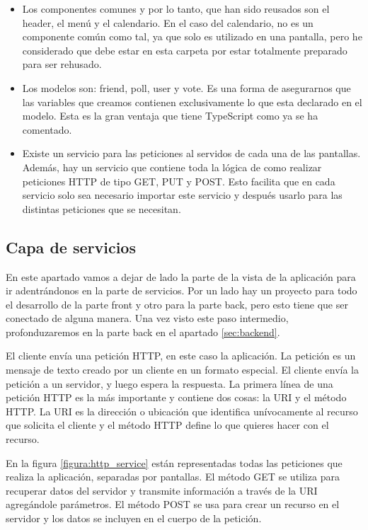 \documentclass[a4paper, 12pt]{book}
\begin{document}
\begin{itemize}
\item Los componentes comunes y por lo tanto, que han sido reusados son el header, el men\'u y el calendario. En el caso del calendario, no es un componente com\'un como tal, ya que solo es utilizado en una pantalla, pero he considerado que debe estar en esta carpeta por estar totalmente preparado para ser rehusado.
\item Los modelos son: friend, poll, user y vote. Es una forma de asegurarnos que las variables que creamos contienen exclusivamente lo que esta declarado en el modelo. Esta es la gran ventaja que tiene TypeScript como ya se ha comentado.

\item Existe un servicio para las peticiones al servidos de cada una de las pantallas. Adem\'as, hay un servicio que contiene toda la l\'ogica de como realizar peticiones HTTP de tipo GET, PUT y POST. Esto facilita que en cada servicio solo sea necesario importar este servicio y despu\'es usarlo para las distintas peticiones que se necesitan.
\end{itemize}


\subsection{Capa de servicios} 
\label{sec:arquitectura}

En este apartado vamos a dejar de lado la parte de la vista de la aplicaci\'on para ir adentr\'andonos en la parte de servicios. Por un lado hay un proyecto para todo el desarrollo de la parte front y otro para la parte back, pero esto tiene que ser conectado de alguna manera. Una vez visto este paso intermedio, profonduzaremos en la parte back en el apartado \ref{sec:backend}.


El cliente env\'ia una petici\'on HTTP, en este caso la aplicaci\'on. La petici\'on es un mensaje de texto creado por un cliente en un formato especial. El cliente env\'ia la petici\'on a un servidor, y luego espera la respuesta. La primera l\'inea de una petici\'on HTTP es la m\'as importante y contiene dos cosas: la URI y el m\'etodo HTTP. La URI es la direcci\'on o ubicaci\'on que identifica un\'ivocamente al recurso que solicita el cliente y el m\'etodo HTTP  define lo que quieres hacer con el recurso.

En la figura \ref{figura:http_service} est\'an representadas todas las peticiones que realiza la aplicaci\'on, separadas por pantallas. El m\'etodo GET se utiliza para recuperar datos del servidor y transmite informaci\'on a trav\'es de la URI agreg\'andole par\'ametros. El m\'etodo POST se usa para crear un recurso en el servidor y los datos se incluyen en el cuerpo de la petici\'on.
\end{document}
